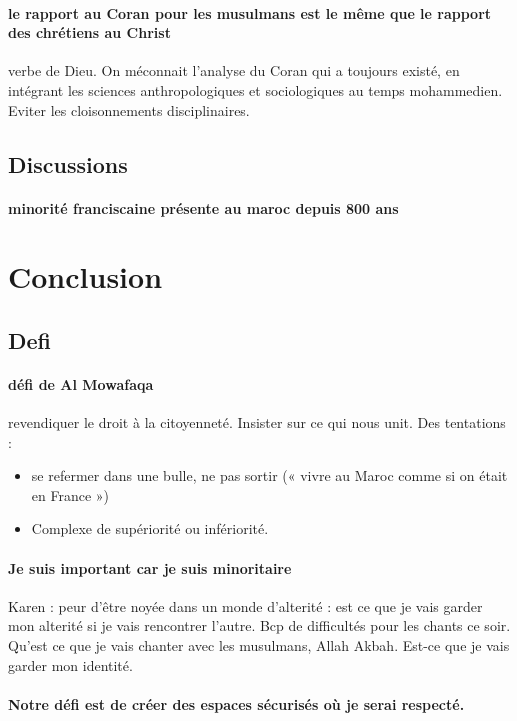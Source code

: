 \paragraph{le rapport au Coran pour les musulmans est le même que le rapport des chrétiens au Christ} verbe de Dieu. On méconnait l’analyse du Coran qui a toujours existé, en intégrant les sciences anthropologiques et sociologiques au temps mohammedien. Eviter les cloisonnements disciplinaires. 

\subsection{Discussions}

\paragraph{minorité franciscaine présente au maroc depuis 800 ans}

\section{Conclusion}
\subsection{Defi}
\paragraph{défi de Al Mowafaqa} revendiquer le droit à la citoyenneté. Insister sur ce qui nous unit. 
Des tentations : 
\begin{itemize}
\item se refermer dans une bulle, ne pas sortir (« vivre au Maroc comme si on était en France »)
\item Complexe de supériorité ou infériorité. 
\end{itemize}

\paragraph{Je suis important car je suis minoritaire} Karen : peur d’être noyée dans un monde d’alterité : est ce que je vais garder mon alterité si je vais rencontrer l’autre.  Bcp de difficultés pour les chants ce soir. Qu’est ce que je vais chanter avec les musulmans, Allah Akbah. Est-ce que je vais garder mon identité. 
\paragraph{Notre défi est de créer des espaces sécurisés où je serai respecté.  }
